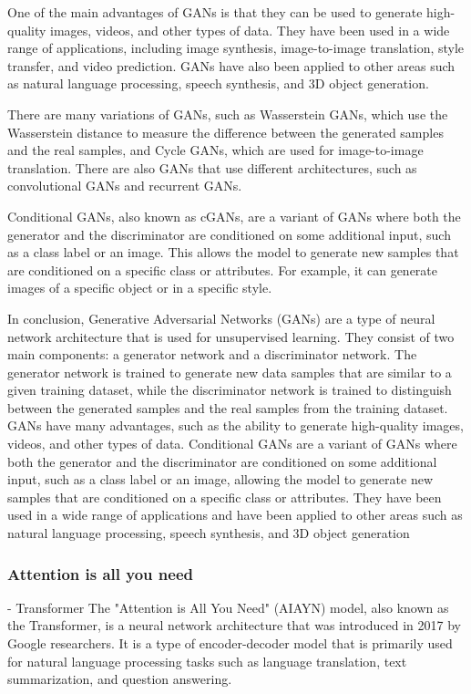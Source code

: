 One of the main advantages of GANs is that they can be used to generate high-quality images, videos, and other types of data. They have been used in a wide range of applications, including image synthesis, image-to-image translation, style transfer, and video prediction. GANs have also been applied to other areas such as natural language processing, speech synthesis, and 3D object generation.

There are many variations of GANs, such as Wasserstein GANs, which use the Wasserstein distance to measure the difference between the generated samples and the real samples, and Cycle GANs, which are used for image-to-image translation. There are also GANs that use different architectures, such as convolutional GANs and recurrent GANs.

Conditional GANs, also known as cGANs, are a variant of GANs where both the generator and the discriminator are conditioned on some additional input, such as a class label or an image. This allows the model to generate new samples that are conditioned on a specific class or attributes. For example, it can generate images of a specific object or in a specific style.

In conclusion, Generative Adversarial Networks (GANs) are a type of neural network architecture that is used for unsupervised learning. They consist of two main components: a generator network and a discriminator network. The generator network is trained to generate new data samples that are similar to a given training dataset, while the discriminator network is trained to distinguish between the generated samples and the real samples from the training dataset. GANs have many advantages, such as the ability to generate high-quality images, videos, and other types of data. Conditional GANs are a variant of GANs where both the generator and the discriminator are conditioned on some additional input, such as a class label or an image, allowing the model to generate new samples that are conditioned on a specific class or attributes. They have been used in a wide range of applications and have been applied to other areas such as natural language processing, speech synthesis, and 3D object generation

\subsubsection{Attention is all you need}
- Transformer
The "Attention is All You Need" (AIAYN) model, also known as the Transformer, is a neural network architecture that was introduced in 2017 by Google researchers. It is a type of encoder-decoder model that is primarily used for natural language processing tasks such as language translation, text summarization, and question answering.

